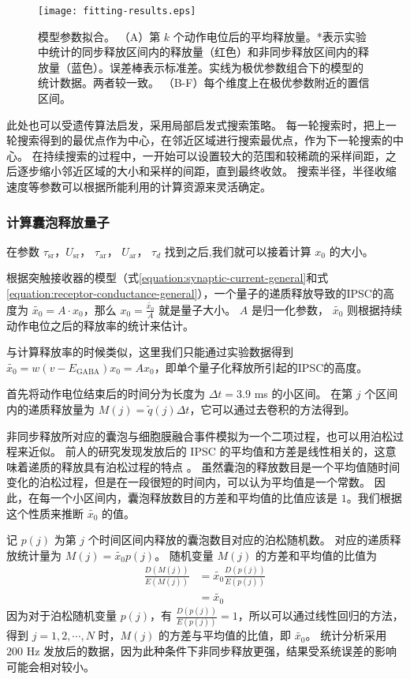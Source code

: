 \begin{figure}
\centering
\texttt{[image: fitting-results.eps]}
\caption{模型参数拟合。
（A）第 $k$ 个动作电位后的平均释放量。*表示实验中统计的同步释放区间内的释放量（红色）和非同步释放区间内的释放量（蓝色）。误差棒表示标准差。实线为极优参数组合下的模型的统计数据。两者较一致。
（B-F）每个维度上在极优参数附近的置信区间。}
\label{figure:fs-pc-fitting}
\end{figure}

此处也可以受遗传算法启发，采用局部启发式搜索策略。
每一轮搜索时，把上一轮搜索得到的最优点作为中心，在邻近区域进行搜索最优点，作为下一轮搜索的中心。
在持续搜索的过程中，一开始可以设置较大的范围和较稀疏的采样间距，之后逐步缩小邻近区域的大小和采样的间距，直到最终收敛。
搜索半径，半径收缩速度等参数可以根据所能利用的计算资源来灵活确定。

\subsubsection{计算囊泡释放量子}
在参数 $\tau_\text{sr}$，$U_\text{sr}$， $\tau_\text{ar}$， $U_\text{ar}$， $\tau_d$ 找到之后,我们就可以接着计算 $x_0$ 的大小。

根据突触接收器的模型（式\ref{equation:synaptic-current-general}和式\ref{equation:receptor-conductance-general}），一个量子的递质释放导致的IPSC的高度为 $\tilde{x_0} = A \cdot x_0$，那么 $x_0 = \frac{\tilde{x_0}}{A}$ 就是量子大小。
$A$ 是归一化参数， $\tilde{x_0}$ 则根据持续动作电位之后的释放率的统计来估计。

与计算释放率的时候类似，这里我们只能通过实验数据得到 $\tilde{x_0} = w(v - E_\text{GABA}) x_0 = Ax_0$，即单个量子化释放所引起的IPSC的高度。

首先将动作电位结束后的时间分为长度为 $\Delta t = 3.9$ ms 的小区间。
在第 $j$ 个区间内的递质释放量为 $M(j) = \tilde{q}(j)\Delta t$，它可以通过去卷积的方法得到。

非同步释放所对应的囊泡与细胞膜融合事件模拟为一个二项过程，也可以用泊松过程来近似。
前人的研究发现发放后的 IPSC 的平均值和方差是线性相关的\cite{Hefft2005}，这意味着递质的释放具有泊松过程的特点 \cite{DELCASTILLO1954}。
虽然囊泡的释放数目是一个平均值随时间变化的泊松过程，但是在一段很短的时间内，可以认为平均值是一个常数。
因此，在每一个小区间内，囊泡释放数目的方差和平均值的比值应该是 $1$。我们根据这个性质来推断 $\tilde{x_0}$ 的值。

记 $p(j)$ 为第 $j$ 个时间区间内释放的囊泡数目对应的泊松随机数。
对应的递质释放统计量为 $M(j) = \tilde{x_0}p(j)$。
随机变量 $M(j)$ 的方差和平均值的比值为
\begin{equation}
\begin{split}
\frac{D\left( M(j) \right)}{E\left( M(j) \right)} &= \tilde{x_0}\frac{D\left( p(j) \right)}{E\left( p(j) \right)} \\
&= \tilde{x_0}
\end{split}
\label{equation:quantum-size}
\end{equation}
因为对于泊松随机变量 $p(j)$，有 $\frac{D\left( p(j) \right)}{E\left( p(j) \right)} = 1$，所以可以通过线性回归的方法，得到 $j = 1,2,\cdots,N$ 时，$M(j)$ 的方差与平均值的比值，即 $\tilde{x_0}$。
统计分析采用 $200$ Hz 发放后的数据，因为此种条件下非同步释放更强，结果受系统误差的影响可能会相对较小。

